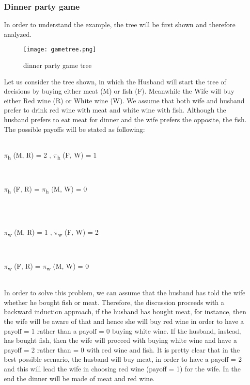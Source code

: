 \documentclass[conference]{IEEEtran}
\begin{document}
\subsubsection{Dinner party game}
In order to understand the example, the tree will be first shown and therefore analyzed.
\begin{figure}[h]
    \centerline{\texttt{[image: gametree.png]}}
    \caption{dinner party game tree}
    \label{gametree}
\end{figure}

Let us consider the tree shown, in which the Husband will start the tree of decisions by buying either meat (M) or fish (F). Meanwhile the Wife will buy either Red wine (R) or White wine (W). We assume that both wife and husband prefer to drink red wine with meat and white wine with fish. Although the husband prefers to eat meat for dinner and the wife prefers the opposite, the fish. The possible payoffs will be stated as following:\\ \\
\centerline{$\pi$\textsubscript{h} (M, R) = 2 ,  $\pi$\textsubscript{h} (F, W) = 1} \\
\centerline{$\pi$\textsubscript{h} (F, R) = $\pi$\textsubscript{h} (M, W) = 0} \\\\
\centerline{$\pi$\textsubscript{w} (M, R) = 1 ,  $\pi$\textsubscript{w} (F, W) = 2} \\
\centerline{$\pi$\textsubscript{w} (F, R) = $\pi$\textsubscript{w} (M, W) = 0}
\\

In order to solve this problem, we can assume that the husband has told the wife whether he bought fish or meat. Therefore, the discussion proceeds with a backward induction approach, if the husband has bought meat, for instance, then the wife will be aware of that and hence she will buy red wine in order to have a payoff = 1 rather than a payoff = 0 buying white wine. If the husband, instead, has bought fish, then the wife will proceed with buying white wine and have a payoff = 2 rather than = 0 with red wine and fish.
It is pretty clear that in the best possible scenario, the husband will buy meat, in order to have a payoff = 2 and this will lead the wife in choosing red wine (payoff = 1) for the wife. In the end the dinner will be made of meat and red wine.\cite{b7}
\end{document}

